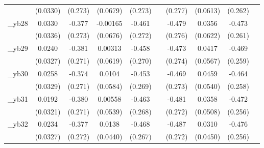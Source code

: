 \begin{table}[htbp]
\begin{tabular}{l*{9}{c}}
            &    (0.0330)         &     (0.273)         &    (0.0679)         &     (0.273)         &                     &     (0.277)         &    (0.0613)         &     (0.262)         &                     \\
[1em]
\_yb28       &      0.0330         &      -0.377         &    -0.00165         &      -0.461\sym{*}  &                     &      -0.479\sym{*}  &      0.0356         &      -0.473\sym{*}  &                     \\
            &    (0.0336)         &     (0.273)         &    (0.0676)         &     (0.272)         &                     &     (0.276)         &    (0.0622)         &     (0.261)         &                     \\
[1em]
\_yb29       &      0.0240         &      -0.381         &     0.00313         &      -0.458\sym{*}  &                     &      -0.473\sym{*}  &      0.0417         &      -0.469\sym{*}  &                     \\
            &    (0.0327)         &     (0.271)         &    (0.0619)         &     (0.270)         &                     &     (0.274)         &    (0.0567)         &     (0.259)         &                     \\
[1em]
\_yb30       &      0.0258         &      -0.374         &      0.0104         &      -0.453\sym{*}  &                     &      -0.469\sym{*}  &      0.0459         &      -0.464\sym{*}  &                     \\
            &    (0.0329)         &     (0.271)         &    (0.0584)         &     (0.269)         &                     &     (0.273)         &    (0.0540)         &     (0.258)         &                     \\
[1em]
\_yb31       &      0.0192         &      -0.380         &     0.00558         &      -0.463\sym{*}  &                     &      -0.481\sym{*}  &      0.0358         &      -0.472\sym{*}  &                     \\
            &    (0.0321)         &     (0.271)         &    (0.0539)         &     (0.268)         &                     &     (0.272)         &    (0.0508)         &     (0.256)         &                     \\
[1em]
\_yb32       &      0.0234         &      -0.377         &      0.0138         &      -0.468\sym{*}  &                     &      -0.487\sym{*}  &      0.0310         &      -0.476\sym{*}  &                     \\
            &    (0.0327)         &     (0.272)         &    (0.0440)         &     (0.267)         &                     &     (0.272)         &    (0.0450)         &     (0.256)         &                     \\

\end{tabular}
\end{table}

